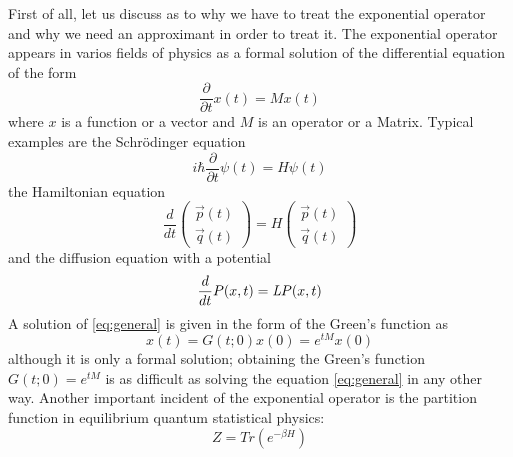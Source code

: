 First of all, let us discuss as to why we have to treat the exponential operator and why we need an approximant in order to treat it. The exponential operator appears in varios fields of physics as a formal solution of the differential equation of the form
\begin{equation} \label{eq:general}
\dfrac{\partial}{\partial t} x(t) = M x(t)
\end{equation}
where $x$ is a function or a vector and $M$ is an operator or a Matrix. Typical examples are the Schr\"odinger equation
\begin{equation}
i\hbar\dfrac{\partial}{\partial t} \psi(t) = H\psi(t)
\end{equation}
the Hamiltonian equation
\begin{equation}
\dfrac{d}{d t} 
\begin{pmatrix}
\vec{p}(t) \\ \vec{q}(t)
\end{pmatrix}
= H
\begin{pmatrix}
\vec{p}(t) \\ \vec{q}(t)
\end{pmatrix}
\end{equation}
and the diffusion equation with a potential
\begin{equation}
\dfrac{d}{dt}P(x,t) = \emph{L} P(x,t)
\end{equation}
A solution of \eqref{eq:general} is given in the form of the Green's function as 
\begin{equation}
x(t) = G(t;0)x(0) = e^{tM}x(0)
\end{equation}
although it is only a formal solution; obtaining the Green's function $G(t;0) = e^{tM}$ is as difficult as solving the equation \eqref{eq:general} in any other way. Another important incident of the exponential operator is the partition function in equilibrium quantum statistical physics:
\begin{equation}
Z = Tr(e^{- \beta H})
\end{equation}

